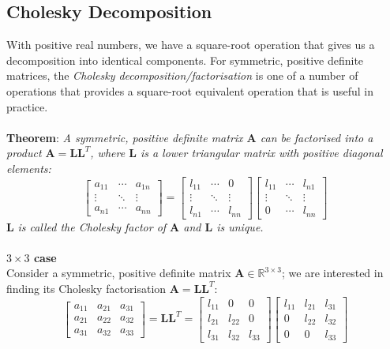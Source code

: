 \documentclass{report}
\begin{document}
\subsection{Cholesky Decomposition}%
With positive real numbers, we have a square-root operation that gives us a decomposition into identical components.
For symmetric, positive definite matrices, the \textit{Cholesky decomposition/factorisation} is one of a number of
operations that provides a square-root equivalent operation that is useful in practice.\\
\vspace{1mm}\\
\textbf{Theorem}: \textit{A symmetric, positive definite matrix $\bm{A}$ can be factorised into a product 
$\bm{A}=\bm{LL}^T$, where $\bm{L}$ is a lower triangular matrix with positive diagonal elements:}
\begin{equation*}
\begin{bmatrix}
a_{11}&\cdots&a_{1n}\\
\vdots&\ddots&\vdots\\
a_{n1}&\cdots&a_{nn}
\end{bmatrix}=
\begin{bmatrix}
l_{11}&\cdots&0\\
\vdots&\ddots&\vdots\\
l_{n1}&\cdots&l_{nn}
\end{bmatrix}
\begin{bmatrix}
l_{11}&\cdots&l_{n1}\\
\vdots&\ddots&\vdots\\
0&\cdots&l_{nn}
\end{bmatrix}
\end{equation*}
$\bm{L}$ \textit{is called the Cholesky factor of $\bm{A}$ and $\bm{L}$ is unique.}\\
\vspace{1mm}\\
\textbf{$3\times3$ case}\\
Consider a symmetric, positive definite matrix $\bm{A}\in\mathbb{R}^{3\times3}$; we are interested in finding
its Cholesky factorisation $\bm{A}=\bm{LL}^T$:
\begin{equation*}
\begin{bmatrix}
a_{11}&a_{21}&a_{31}\\
a_{21}&a_{22}&a_{32}\\
a_{31}&a_{32}&a_{33}
\end{bmatrix}
=\bm{LL}^T=
\begin{bmatrix}
l_{11}&0&0\\
l_{21}&l_{22}&0\\
l_{31}&l_{32}&l_{33}
\end{bmatrix}
\begin{bmatrix}
l_{11}&l_{21}&l_{31}\\
0&l_{22}&l_{32}\\
0&0&l_{33}
\end{bmatrix}
\end{equation*}
\end{document}
